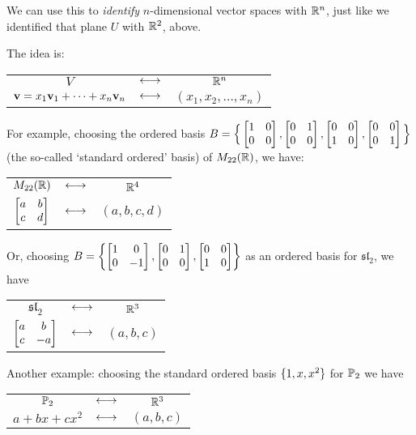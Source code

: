 We can use this to \emph{identify} $n$-dimensional vector spaces with $\mathbb{R}^n$, 
just like we identified that plane $U$ with $\mathbb{R}^2$, above.

The idea is:

\begin{center}
\begin{tabular}{ccc}
$V$ &$\leftarrow \kern-.1em\rightarrow$ &$\mathbb{R}^n$ \\ 
$\mathbf{v} = x_1\mathbf{v}_1 + \cdots + x_n\mathbf{v}_n$ & $\leftarrow \kern-.1em\rightarrow$ & $(x_1,x_2, \ldots, x_n)$ 
\end{tabular}
\end{center}

For example, choosing the ordered basis  $B=\Big\{\bmatrix 1&0\\0&0\endbmatrix, \bmatrix 0&1\\0&0\endbmatrix,\bmatrix 0&0\\1&0\endbmatrix,\bmatrix 0&0\\0&1\endbmatrix \Big\}$  (the so-called `standard ordered' basis) of $M_{22}(\mathbb{R})$, 
we have:

\begin{center}
\begin{tabular}{ccc}
$M_{22}(\mathbb{R})$  &$\leftarrow \kern-.1em\rightarrow$&  $\mathbb{R}^4$ \\ 
$\left[ \begin{matrix} a&b\\c&d \end{matrix} \right]$&$\leftarrow \kern-.1em\rightarrow$ & $(a,b,c,d)$
\end{tabular}
\end{center}

Or, choosing $B = \left\{\left[ \begin{matrix} 1&0\\0 & -1 \end{matrix} \right], \left[ \begin{matrix} 0&1\\0&0 \end{matrix} \right], \left[ \begin{matrix} 0&0\\1&0 \end{matrix} \right]\right\}$ as an ordered basis for $\mathfrak{sl}_2$, we have

\begin{center}
\begin{tabular}{ccc}
$\mathfrak{sl}_2 $ &$\leftarrow \kern-.1em\rightarrow$& $\mathbb{R}^3$ \\ 
$\left[ \begin{matrix} a&b\\c&-a \end{matrix} \right]$&$\leftarrow \kern-.1em\rightarrow$ & $(a,b,c)$
\end{tabular}
\end{center}

Another example: choosing the standard ordered basis $\{1, x, x^2 \}$ for $\mathbb{P}_2$ we have

\begin{center}
\begin{tabular}{ccc}
$\mathbb{P}_2$ &$\leftarrow \kern-.1em\rightarrow$& $\mathbb{R}^3$ \\ 
$a+bx+cx^2$&$\leftarrow \kern-.1em\rightarrow$ & $(a,b,c)$
\end{tabular}
\end{center}




